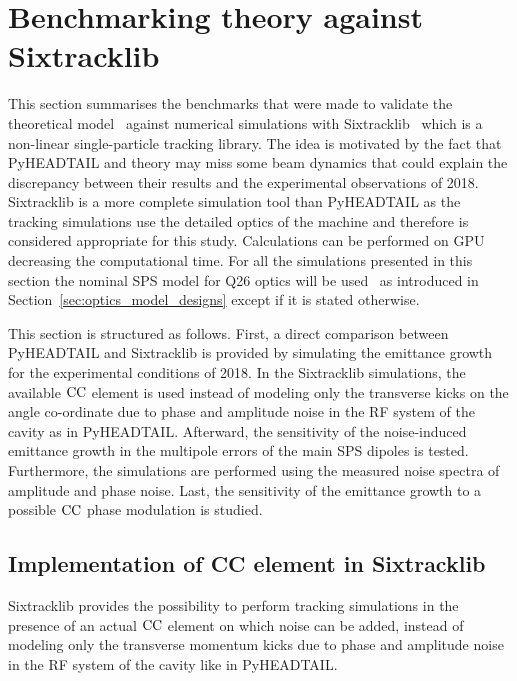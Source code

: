 \section{Benchmarking theory against Sixtracklib}\label{sec:benchmark_theory_with_sixtracklib}
This section summarises the benchmarks that were made to validate the theoretical model~\cite{PhysRevSTAB.18.101001} against numerical simulations with Sixtracklib~\cite{sixtracklib_repo} which is a non-linear single-particle tracking library. The idea is motivated by the fact that PyHEADTAIL and theory may miss some beam dynamics that could explain the discrepancy between their results and the experimental observations of 2018. Sixtracklib is a more complete simulation tool than PyHEADTAIL as the tracking simulations use the detailed optics of the machine and therefore is considered appropriate for this study. Calculations can be performed on GPU decreasing the computational time. For all the simulations presented in this section the nominal SPS model for Q26 optics will be used~\cite{cern_optics_repo} as introduced in Section~\ref{sec:optics_model_designs} except if it is stated otherwise.


This section is structured as follows. First, a direct comparison between PyHEADTAIL and Sixtracklib is provided by simulating the emittance growth for the experimental conditions of 2018. In the Sixtracklib simulations, the available ${\mathrm{CC}}$ element is used instead of modeling only the transverse kicks on the angle co-ordinate due to phase and amplitude noise in the RF system of the cavity as in PyHEADTAIL. Afterward, the sensitivity of the noise-induced emittance growth in the multipole errors of the main SPS dipoles is tested. Furthermore, the simulations are performed using the measured noise spectra of amplitude and phase noise. Last, the sensitivity of the emittance growth to a possible ${\mathrm{CC}}$ phase modulation is studied.

\subsection{Implementation of CC element in Sixtracklib}\label{subsec:sixtracklig_CC_implementation}
Sixtracklib provides the possibility to perform tracking simulations in the presence of an actual ${\mathrm{CC}}$ element on which noise can be added, instead of modeling only the transverse momentum kicks due to phase and amplitude noise in the RF system of the cavity like in PyHEADTAIL.

